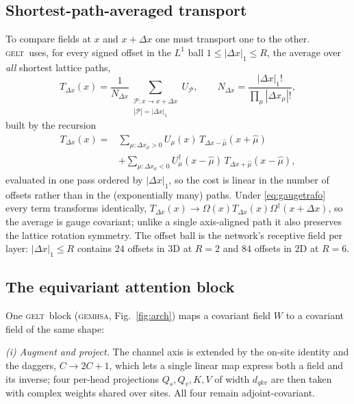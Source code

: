 \documentclass[aps,prl,reprint,superscriptaddress,nofootinbib]{revtex4-2}
\newcommand{\GELT}{\textsc{gelt}}
\begin{document}
\subsection{Shortest-path-averaged transport}

To compare fields at $x$ and $x+\Delta x$ one must transport one to the other.
\GELT\ uses, for every signed offset in the $L^1$ ball
$1\le|\Delta x|_1\le R$, the average over \emph{all} shortest lattice paths,
\begin{equation}
  T_{\Delta x}(x)=\frac{1}{N_{\Delta x}}
  \sum_{\substack{\mathcal{P}:x\to x+\Delta x\\ |\mathcal{P}|=|\Delta x|_1}}
  U_{\mathcal{P}},
  \qquad
  N_{\Delta x}=\frac{|\Delta x|_1!}{\prod_\mu |\Delta x_\mu|!},
  \label{eq:transport}
\end{equation}
built by the recursion
\begin{equation}
\begin{split}
  T_{\Delta x}(x)=&\!\!\sum_{\mu:\Delta x_\mu>0}\!\! U_\mu(x)\,T_{\Delta x-\hat\mu}(x{+}\hat\mu)\\
  &+\!\!\sum_{\mu:\Delta x_\mu<0}\!\! U^\dagger_\mu(x{-}\hat\mu)\,T_{\Delta x+\hat\mu}(x{-}\hat\mu),
\end{split}
\end{equation}
evaluated in one pass ordered by $|\Delta x|_1$, so the cost is linear in the
number of offsets rather than in the (exponentially many) paths. Under
\eqref{eq:gaugetrafo} every term transforms identically,
$T_{\Delta x}(x)\to\Omega(x)T_{\Delta x}(x)\Omega^\dagger(x{+}\Delta x)$, so the
average is gauge covariant; unlike a single axis-aligned path it also preserves
the lattice rotation symmetry. The offset ball is the network's receptive field
per layer: $|\Delta x|_1\le R$ contains $24$ offsets in $3$D at $R=2$ and $84$
offsets in $2$D at $R=6$.

\subsection{The equivariant attention block}

One \GELT\ block (\textsc{gemhsa}, Fig.~\ref{fig:arch}) maps a covariant field
$W$ to a covariant field of the same shape:

\emph{(i) Augment and project.} The channel axis is extended by the on-site
identity and the daggers, $C\to 2C+1$, which lets a single linear map express
both a field and its inverse; four per-head projections
$Q_s,Q_v,K,V$ of width $d_{qkv}$ are then taken with complex weights shared over
sites. All four remain adjoint-covariant.
\end{document}

